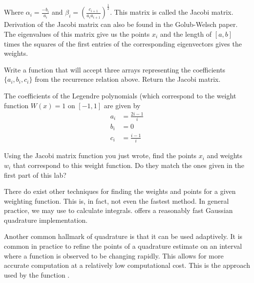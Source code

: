 Where $\alpha_i = \frac{-b_i}{a_i}$ and $\beta_i = (\frac{c_{i+1}}{a_ia_{i+1}})^{\frac{1}{2}}$.
This matrix is called the Jacobi matrix.
Derivation of the Jacobi matrix can also be found in the Golub-Welsch paper.
The eigenvalues of this matrix give us the points $x_i$ and the length of $\left[a, b\right]$ times the squares of the first entries of the corresponding eigenvectors gives the weights.

\begin{problem}
Write a function that will accept three arrays representing the coefficients $\{a_i, b_i, c_i\}$ from the recurrence relation above.
Return the Jacobi matrix.
\end{problem}

\begin{problem}
The coefficients of the Legendre polynomials (which correspond to the weight function $W(x) = 1$ on $[-1,1]$ are given by
\begin{align*}
a_i &= \frac{2i - 1}{i} \\
b_i &= 0 \\
c_i &= \frac{i-1}{i}
\end{align*}

Using the Jacobi matrix function you just wrote, find the points $x_i$ and weights $w_i$ that correspond to this weight function.
Do they match the ones given in the first part of this lab?

\end{problem}


There do exist other techniques for finding the weights and points for a given weighting function.
This is, in fact, not even the fastest method.
In general practice, we may use  to calculate integrals.
 offers a reasonably fast Gaussian quadrature implementation.

Another common hallmark of quadrature is that it can be used adaptively.
It is common in practice to refine the points of a quadrature estimate on an interval where a function is observed to be changing rapidly.
This allows for more accurate computation at a relatively low computational cost.
This is the approach used by the function .

